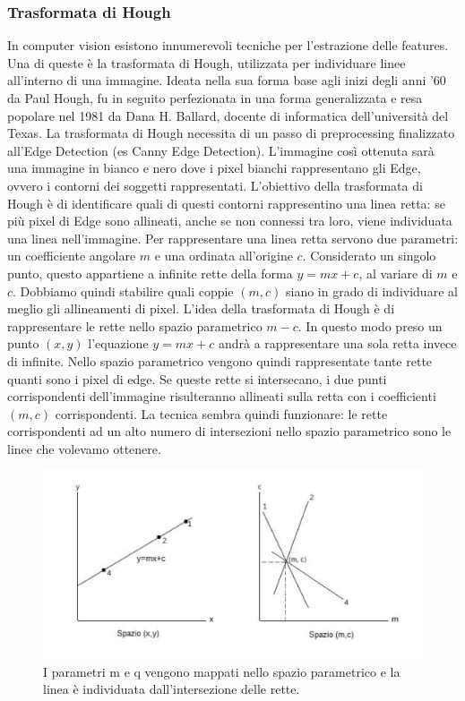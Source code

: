 \documentclass[twoside]{supsistudent}
\begin{document}
\subsubsection{Trasformata di Hough}
In computer vision esistono innumerevoli tecniche per l'estrazione delle features. Una 
di queste è la trasformata di Hough, utilizzata per individuare linee all'interno di una 
immagine. Ideata nella sua forma base agli inizi degli anni '60 da Paul Hough, fu in 
seguito perfezionata in una forma generalizzata e resa popolare nel 1981 da Dana H. 
Ballard, docente di informatica dell'università del Texas.
La trasformata di Hough necessita di un passo di preprocessing finalizzato all'Edge 
Detection (es Canny Edge Detection). L'immagine così ottenuta sarà una immagine in bianco e nero
dove i pixel bianchi rappresentano gli Edge, ovvero i contorni dei soggetti 
rappresentati. L'obiettivo della trasformata di Hough è di identificare quali di questi 
contorni rappresentino una linea retta: se più pixel di Edge sono allineati, anche se non 
connessi tra loro, viene individuata una linea nell'immagine.
Per rappresentare una linea retta servono due parametri: un coefficiente angolare $m$ e 
una ordinata all'origine $c$. Considerato un singolo punto, questo appartiene a infinite 
rette della forma $y=mx+c$, al variare di $m$ e $c$. Dobbiamo quindi stabilire quali coppie 
$(m,c)$ siano in grado di individuare al meglio gli allineamenti di pixel.
L'idea della trasformata di Hough è di rappresentare le rette nello spazio parametrico 
$m-c$. In questo modo preso un punto $(x,y)$ l'equazione $y=mx+c$ andrà a rappresentare 
una sola retta invece di infinite. Nello spazio parametrico vengono quindi rappresentate 
tante rette quanti sono i pixel di edge. Se queste rette si intersecano, i due punti 
corrispondenti dell'immagine risulteranno allineati sulla retta con i coefficienti 
$(m,c)$ corrispondenti. La tecnica sembra quindi funzionare: le rette corrispondenti ad 
un alto numero di intersezioni nello spazio parametrico sono le linee che volevamo 
ottenere.
\begin{figure}[H]
  \center
  \includegraphics[scale=0.38]{images/spazioMC.png}
  \caption{I parametri m e q vengono mappati nello spazio parametrico e la linea è 
  individuata dall'intersezione delle rette.}
\end{figure}
\end{document}
